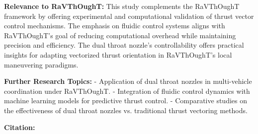 \textbf{Relevance to RaVThOughT:}
This study complements the RaVThOughT framework by offering experimental and computational validation of thrust vector control mechanisms. The emphasis on fluidic control systems aligns with RaVThOughT's goal of reducing computational overhead while maintaining precision and efficiency. The dual throat nozzle’s controllability offers practical insights for adapting vectorized thrust orientation in RaVThOughT’s local maneuvering paradigms.

\textbf{Further Research Topics:}
- Application of dual throat nozzles in multi-vehicle coordination under RaVThOughT.
- Integration of fluidic control dynamics with machine learning models for predictive thrust control.
- Comparative studies on the effectiveness of dual throat nozzles vs. traditional thrust vectoring methods.

\textbf{Citation:} 


\endinput  %
